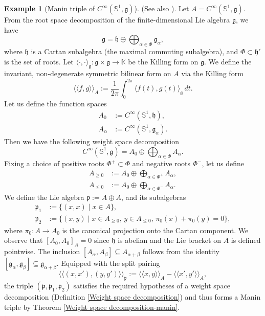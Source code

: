 \documentclass[11pt,reqno]{amsart}
\theoremstyle{definition}
\newtheorem{example}[theorem]{Example}
\numberwithin{equation}{section}
\begin{document}
\begin{example}[Manin triple of $C^{\infty}(\mathbb{S}^1, \mathfrak{g})$]
(See also \cite[Example 3]{8}). Let $A = C^{\infty}(\mathbb{S}^1, \mathfrak{g})$. From the root space decomposition of the finite-dimensional Lie algebra $\mathfrak{g}$, we have
\[
\mathfrak{g} = \mathfrak{h} \oplus \bigoplus_{\alpha \in \Phi} \mathfrak{g}_{\alpha},
\]
where $\mathfrak{h}$ is a Cartan subalgebra (the maximal commuting subalgebra), and $\Phi \subset \mathfrak{h}'$ is the set of roots. Let $\langle \cdot, \cdot \rangle_{\mathfrak{g}} : \mathfrak{g} \times \mathfrak{g} \rightarrow \mathbb{K}$ be the Killing form on $\mathfrak{g}$. We define the invariant, non-degenerate symmetric bilinear form on $A$ via the Killing form
\[
\langle\langle f, g \rangle\rangle_A := \frac{1}{2\pi}\int_0^{2\pi} \langle f(t), g(t) \rangle_{\mathfrak{g}} \, dt.
\]
Let us define the function spaces
\begin{align*}
A_0 &:= C^{\infty}(\mathbb{S}^1, \mathfrak{h}), \\
A_{\alpha} &:= C^{\infty}(\mathbb{S}^1, \mathfrak{g}_{\alpha}).
\end{align*}
Then we have the following weight space decomposition
\[
C^{\infty}(\mathbb{S}^1, \mathfrak{g}) = A_0 \oplus \bigoplus_{\alpha \in \Phi} A_{\alpha}.
\]
Fixing a choice of positive roots $\Phi^+ \subset \Phi$ and negative roots $\Phi^-$, let us define
\begin{align*}
A_{\ge 0} &:= A_0 \oplus \bigoplus_{\alpha \in \Phi^+} A_{\alpha}, \\
A_{\le 0} &:= A_0 \oplus \bigoplus_{\alpha \in \Phi^-} A_{\alpha}.
\end{align*}
We define the Lie algebra $\mathfrak{p} := A \oplus A$, and its subalgebras
\begin{align*}
\mathfrak{p}_1 &:= \{(x, x) \mid x \in A\}, \\
\mathfrak{p}_2 &:= \{(x, y) \mid x \in A_{\ge 0}, \, y \in A_{\le 0}, \, \pi_0(x) + \pi_0(y) = 0\},
\end{align*}
where $\pi_0: A \rightarrow A_0$ is the canonical projection onto the Cartan component. We observe that $[A_0, A_0]_A = 0$ since $\mathfrak{h}$ is abelian and the Lie bracket on $A$ is defined pointwise. The inclusion $[A_{\alpha}, A_{\beta}] \subseteq A_{\alpha+\beta}$ follows from the identity $[\mathfrak{g}_{\alpha}, \mathfrak{g}_{\beta}] \subseteq \mathfrak{g}_{\alpha+\beta}$. Equipped with the split pairing 
\[
\langle\langle (x, x'), (y, y') \rangle\rangle_{\mathfrak{p}} := \langle\langle x, y \rangle\rangle_A - \langle\langle x', y' \rangle\rangle_A,
\]
the triple $(\mathfrak{p}, \mathfrak{p}_1, \mathfrak{p}_2)$ satisfies the required hypotheses of a weight space decomposition (Definition \ref{Weight space decomposition}) and thus forms a Manin triple by Theorem \ref{Weight space decomposition-manin}.
\end{example}
\end{document}
